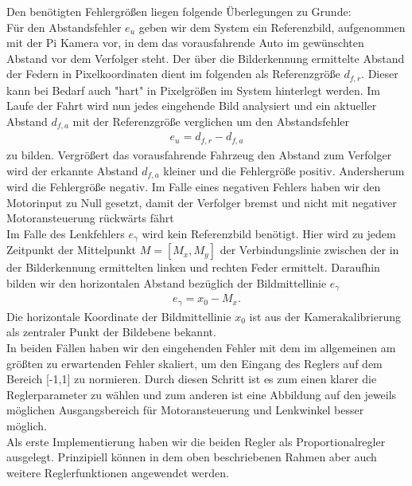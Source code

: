 \documentclass[10pt]{article}
\begin{document}
    Den benötigten Fehlergrößen liegen folgende Überlegungen zu Grunde:\\
    Für den Abstandsfehler $e_u$ geben wir dem System ein Referenzbild, aufgenommen mit der Pi Kamera vor, in dem das vorausfahrende Auto im gewünschten Abstand vor dem Verfolger steht.
    Der über die Bilderkennung ermittelte Abstand der Federn in Pixelkoordinaten dient im folgenden als Referenzgröße $d_{f,r}$. Dieser kann bei Bedarf auch "hart" in Pixelgrößen im System hinterlegt werden. Im Laufe der Fahrt wird nun jedes eingehende Bild analysiert und ein aktueller Abstand $d_{f,a}$ mit der Referenzgröße verglichen um den Abstandsfehler
    \begin{eqnarray}
    e_u = d_{f,r} -d_{f,a}
    \end{eqnarray}
    zu bilden. Vergrößert das vorausfahrende Fahrzeug den Abstand zum Verfolger wird der erkannte Abstand $ d_{f,a} $ kleiner und die Fehlergröße positiv. Andersherum wird die Fehlergröße negativ. Im Falle eines negativen Fehlers haben wir den Motorinput zu Null gesetzt, damit der Verfolger bremst und nicht mit negativer Motoransteuerung rückwärts fährt\\
    Im Falle des Lenkfehlers $e_{\gamma}$ wird kein Referenzbild benötigt. Hier wird zu jedem Zeitpunkt der Mittelpunkt $M=[M_x, M_y]$ der Verbindungslinie zwischen der in der Bilderkennung ermittelten linken und rechten Feder ermittelt. Daraufhin bilden wir den horizontalen Abstand bezüglich der Bildmittellinie $e_{\gamma}$
    \begin{eqnarray}
    e_{\gamma} = x_0 - M_x.
    \end{eqnarray}
    Die horizontale Koordinate der Bildmittellinie $x_0$ ist aus der Kamerakalibrierung als zentraler Punkt der Bildebene bekannt.\\
    In beiden Fällen haben wir den eingehenden Fehler mit dem im allgemeinen am größten zu erwartenden Fehler skaliert, um den Eingang des Reglers auf dem Bereich [-1,1] zu normieren. Durch diesen Schritt ist es zum einen klarer die Reglerparameter zu wählen und zum anderen ist eine Abbildung auf den jeweils möglichen Ausgangsbereich für Motoransteuerung und Lenkwinkel besser möglich.\\
    Als erste Implementierung haben wir die beiden Regler als Proportionalregler ausgelegt. Prinzipiell können in dem oben beschriebenen Rahmen aber auch weitere Reglerfunktionen angewendet werden.\\
\end{document}
